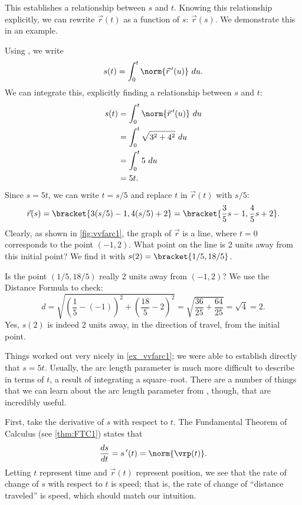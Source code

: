 This establishes a relationship between $s$ and $t$. Knowing this relationship explicitly, we can rewrite $\vec r(t)$ as a function of $s$: $\vec r(s)$. We demonstrate this in an example.


{Using , we write
$$s(t) = \int_0^t \norm{\vec r\,'(u)}\ du.$$
We can integrate this, explicitly finding a relationship between $s$ and $t$:
\begin{align*}
s(t) &= \int_0^t \norm{\vec r\,'(u)}\ du \\
			&= \int_0^t \sqrt{3^2+4^2}\ du\\
			&= \int_0^t 5\ du\\
			&= 5t.
\end{align*}
Since $s=5t$, we can write $t=s/5$ and replace $t$ in $\vec r(t)$ with $s/5$:
$$\vec r(s) =\bracket{3(s/5)-1, 4(s/5)+2}=\bracket{\frac35s-1,\frac45s+2}.$$
Clearly, as shown in \autoref{fig:vvfarc1}, the graph of $\vec r$ is a line, where $t=0$ corresponds to the point $(-1,2)$. What point on the line is 2 units away from this initial point? We find it with $s(2) =\bracket{1/5, 18/5}$. 

Is the point $(1/5,18/5)$ really 2 units away from $(-1,2)$? We use the Distance Formula to check:
$$d = \sqrt{\left(\frac15-(-1)\right)^2+ \left(\frac{18}5-2\right)^2} = \sqrt{\frac{36}{25}+\frac{64}{25}} = \sqrt{4}=2.$$
Yes, $s(2)$ is indeed 2 units away, in the direction of travel, from the initial point.}

Things worked out very nicely in \autoref{ex_vvfarc1}; we were able to establish directly that $s=5t$. Usually, the arc length parameter is much more difficult to describe in terms of $t$, a result of integrating a square--root. There are a number of things that we can learn about the arc length parameter from , though, that are incredibly useful.

First, %
take the derivative of $s$ with respect to $t$. The Fundamental Theorem of Calculus (see \autoref{thm:FTC1}) states that
\begin{equation}
\frac{ds}{dt}=s\,'(t) = \norm{\vrp(t)}.\label{eq:vvfarc3}
\end{equation}
Letting $t$ represent time and $\vec r(t)$ represent position, we see that the rate of change of $s$ with respect to $t$ is speed; that is, the rate of change of ``distance traveled'' is speed, which should match our intuition.

